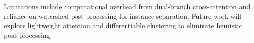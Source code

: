 \documentclass{article}
\begin{document}
Limitations include computational overhead from dual-branch cross-attention and reliance on watershed post processing for instance separation. Future work will explore lightweight attention and differentiable clustering to eliminate heuristic post-processing.



\end{document}
